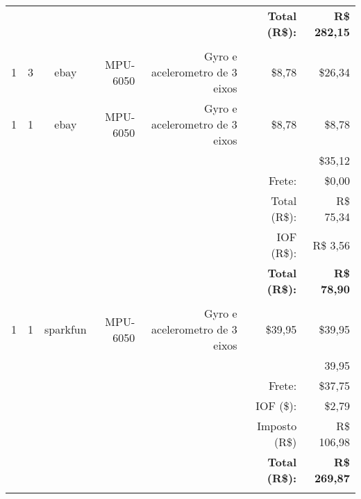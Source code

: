 \begin{table}[!h]
\begin{tabular}{crrrrrr}
          &       & \multicolumn{1}{c}{} & \multicolumn{1}{l}{} & \multicolumn{1}{l}{} & \textbf{Total (R\$):} & \textbf{R\$ 282,15} \\
          &       & \multicolumn{1}{c}{} & \multicolumn{1}{l}{} & \multicolumn{1}{l}{} &       &  \\
    1     & 3     & \multicolumn{1}{c}{ebay} & MPU-6050 & Gyro e acelerometro de 3 eixos & \$8,78 & \$26,34 \\
    1     & 1     & \multicolumn{1}{c}{ebay} & MPU-6050 & Gyro e acelerometro de 3 eixos & \$8,78 & \$8,78 \\
          &       & \multicolumn{1}{c}{} & \multicolumn{1}{l}{} & \multicolumn{1}{l}{} &       & \$35,12 \\
          &       & \multicolumn{1}{c}{} & \multicolumn{1}{l}{} & \multicolumn{1}{l}{} & Frete: & \$0,00 \\
          &       & \multicolumn{1}{c}{} & \multicolumn{1}{l}{} & \multicolumn{1}{l}{} & Total (R\$): & R\$ 75,34 \\
          &       & \multicolumn{1}{c}{} & \multicolumn{1}{l}{} & \multicolumn{1}{l}{} & IOF (R\$): & R\$ 3,56 \\
          &       & \multicolumn{1}{c}{} & \multicolumn{1}{l}{} & \multicolumn{1}{l}{} & \textbf{Total (R\$):} & \textbf{R\$ 78,90} \\
          &       & \multicolumn{1}{c}{} & \multicolumn{1}{l}{} & \multicolumn{1}{l}{} &       &  \\
    1     & 1     & sparkfun & MPU-6050 & Gyro e acelerometro de 3 eixos & \$39,95 & \$39,95 \\
          &       & \multicolumn{1}{c}{} & \multicolumn{1}{l}{} & \multicolumn{1}{l}{} &       & 39,95 \\
          &       & \multicolumn{1}{c}{} & \multicolumn{1}{l}{} & \multicolumn{1}{l}{} & Frete: & \$37,75 \\
          &       & \multicolumn{1}{c}{} & \multicolumn{1}{l}{} & \multicolumn{1}{l}{} & IOF (\$): & \$2,79 \\
          &       & \multicolumn{1}{c}{} & \multicolumn{1}{l}{} & \multicolumn{1}{l}{} & Imposto (R\$) & R\$ 106,98 \\
          &       & \multicolumn{1}{c}{} & \multicolumn{1}{l}{} & \multicolumn{1}{l}{} & \textbf{Total (R\$):} & \textbf{R\$ 269,87} \\
          &       & \multicolumn{1}{c}{} & \multicolumn{1}{l}{} & \multicolumn{1}{l}{} & \textbf{} & \textbf{} \\

\end{tabular}
\end{table}
